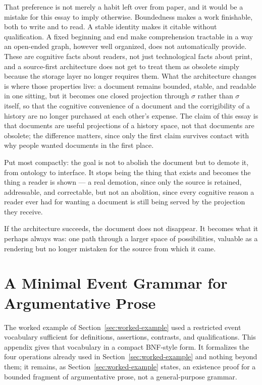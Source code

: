 \documentclass[11pt]{article}
\theoremstyle{definition}
\begin{document}
That preference is not merely a habit left over from paper, and it would be a mistake for this essay to imply otherwise. Boundedness makes a work finishable, both to write and to read. A stable identity makes it citable without qualification. A fixed beginning and end make comprehension tractable in a way an open-ended graph, however well organized, does not automatically provide. These are cognitive facts about readers, not just technological facts about print, and a source-first architecture does not get to treat them as obsolete simply because the storage layer no longer requires them. What the architecture changes is where those properties live: a document remains bounded, stable, and readable in one sitting, but it becomes one closed projection through $\sigma$ rather than $\sigma$ itself, so that the cognitive convenience of a document and the corrigibility of a history are no longer purchased at each other's expense. The claim of this essay is that documents are useful projections of a history space, not that documents are obsolete; the difference matters, since only the first claim survives contact with why people wanted documents in the first place.

Put most compactly: the goal is not to abolish the document but to demote it, from ontology to interface. It stops being the thing that exists and becomes the thing a reader is shown --- a real demotion, since only the source is retained, addressable, and correctable, but not an abolition, since every cognitive reason a reader ever had for wanting a document is still being served by the projection they receive.

If the architecture succeeds, the document does not disappear. It becomes what it perhaps always was: one path through a larger space of possibilities, valuable as a rendering but no longer mistaken for the source from which it came.

\clearpage
\appendix
\section{A Minimal Event Grammar for Argumentative Prose}
\label{app:grammar}

The worked example of Section~\ref{sec:worked-example} used a restricted event vocabulary sufficient for definitions, assertions, contrasts, and qualifications. This appendix gives that vocabulary in a compact BNF-style form. It formalizes the four operations already used in Section~\ref{sec:worked-example} and nothing beyond them; it remains, as Section~\ref{sec:worked-example} states, an existence proof for a bounded fragment of argumentative prose, not a general-purpose grammar.
\end{document}
